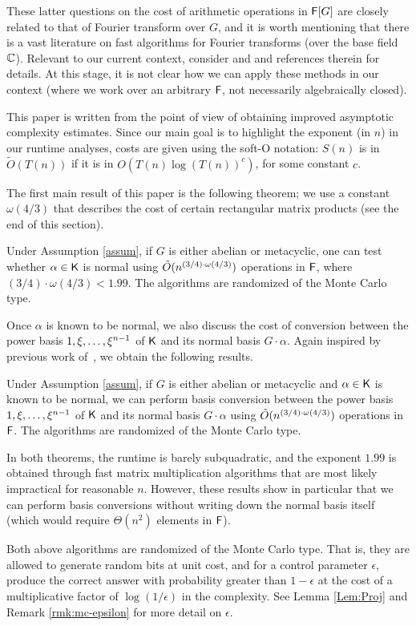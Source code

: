 These latter questions on the cost of arithmetic operations in ${\mathsf{F}}[G]$
are closely related to that of Fourier transform over $G$, and it is
worth mentioning that there is a vast literature on fast algorithms
for Fourier transforms (over the base field $\mathbb{C}$). Relevant to our
current context, consider \citep{ClaMu04} and \citep{MaRockWol18} and
references therein for details. At this stage, it is not clear how we
can apply these methods in our context (where we work over an
arbitrary ${\mathsf{F}}$, not necessarily algebraically closed).

This paper is written from the point of view of obtaining improved
asymptotic complexity estimates. Since our main goal is to highlight
the exponent (in $n$) in our runtime analyses, costs are given using
the soft-O notation: $S(n)$ is in $\tilde{O}(T(n))$ if it is in
$O(T(n) \log(T(n))^c)$, for some constant $c$.

The first main result of this paper is the following theorem; we use a
constant $\omega(4/3)$ that describes the cost of certain rectangular
matrix products (see the end of this section).
\begin{theorem}\label{thm:main}
  Under Assumption \ref{assum}, if $G$ is either abelian or
  metacyclic, one can test whether $\alpha \in {\mathsf{K}}$ is normal using
  $\tilde{O}(n^{(3/4)\cdot \omega(4/3)})$ operations in ${\mathsf{F}}$, where
  $(3/4)\cdot\omega(4/3)<1.99$. The algorithms are randomized of the Monte Carlo type.
\end{theorem}
Once $\alpha$ is known to be normal, we also discuss the cost 
of conversion between the power basis $1,\xi,\dots,\xi^{n-1}$
of ${\mathsf{K}}$ and its normal basis $G\cdot \alpha$. Again inspired by
previous work of~\cite{KalSho98}, we obtain the following results.
\begin{theorem}\label{thm:main2}
  Under Assumption \ref{assum}, if $G$ is either abelian or metacyclic
  and $\alpha \in {\mathsf{K}}$ is known to be normal, we can perform basis
  conversion between the power basis $1,\xi,\dots,\xi^{n-1}$ of
  ${\mathsf{K}}$ and its normal basis $G\cdot \alpha$ using $\tilde{O}(n^{(3/4)\cdot \omega(4/3)})$
  operations in ${\mathsf{F}}$. The algorithms are randomized of the Monte Carlo type.
\end{theorem}
In both theorems, the runtime is barely subquadratic, and the exponent
$1.99$ is obtained through fast matrix multiplication algorithms that
are most likely impractical for reasonable $n$. However, these results
show in particular that we can perform basis conversions without
writing down the normal basis itself (which would require
$\Theta(n^2)$ elements in ${\mathsf{F}}$).
\begin{remark}\label{rmk:mc-prob}
Both above algorithms are randomized of the Monte Carlo type.  That is, they are allowed to generate random bits at unit cost, and for a control parameter $\epsilon$, produce the correct answer with probability greater than $1-\epsilon$ at the cost of a multiplicative factor of $\log(1/\epsilon)$ in the complexity. See Lemma \ref{Lem:Proj} and Remark 
\ref{rmk:mc-epsilon} for more detail on $\epsilon$.
\end{remark}

